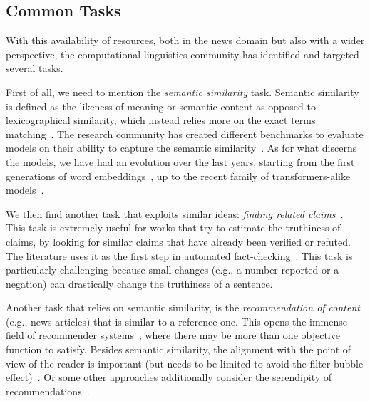 \subsection{\statusgreen Common Tasks}
\label{ssec:lit_relationships_tasks}

With this availability of resources, both in the news domain but also with a wider perspective, the computational linguistics community has identified and targeted several tasks.

First of all, we need to mention the \textit{semantic similarity} task.
Semantic similarity is defined as the likeness of meaning or semantic content as opposed to lexicographical similarity, which instead relies more on the exact terms matching~\citep{harispe2015semantic}.
The research community has created different benchmarks to evaluate models on their ability to capture the semantic similarity~\citep{conneau-kiela-2018-senteval,chandrasekaran2021evolution}.
As for what discerns the models, we have had an evolution over the last years, starting from the first generations of word embeddings~\citep{pennington2014glove,mikolov2013efficient}, up to the recent family of transformers-alike models~\citep{devlin2018bert,cer2018universal,yang2019xlnet,reimers2019sentence}.

We then find another task that exploits similar ideas: \emph{finding related claims}~\citep{almeida2020text}.
This task is extremely useful for works that try to estimate the truthiness of claims, by looking for similar claims that have already been verified or refuted.
The literature uses it as the first step in automated fact-checking~\citep{nakov2021automated,guo2022survey}.
This task is particularly challenging because small changes (e.g., a number reported or a negation) can drastically change the truthiness of a sentence.


Another task that relies on semantic similarity, is the \emph{recommendation of content} (e.g., news articles) that is similar to a reference one.
This opens the immense field of recommender systems~\citep{tintarev2006similarity,karimi2018news,feng2020news}, where there may be more than one objective function to satisfy.
Besides semantic similarity, the alignment with the point of view of the reader is important (but needs to be limited to avoid the filter-bubble effect)~\citep{lunardi2020metric,nguyen2014exploring,lunardi2019representing}.
Or some other approaches additionally consider the serendipity of recommendations~\citep{ziarani2021serendipity,abdollahpouri2021toward,raza2022news}.

